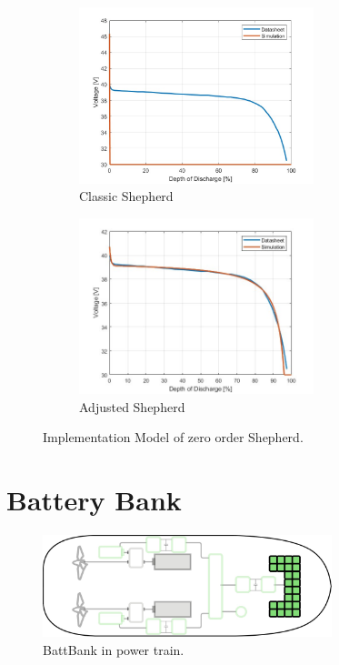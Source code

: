 \begin{figure}[h]

\begin{subfigure}{0.5\textwidth}
    \centering
    \includegraphics[width=0.75\textwidth]{images/chapter05/01_BattCell/BattCellSim1.jpg} 
    \caption{Classic Shepherd}
    \label{fig:subim1}
\end{subfigure}
\begin{subfigure}{0.5\textwidth}
    \centering
    \includegraphics[width=0.75\textwidth]{images/chapter05/01_BattCell/BattCellSim2.jpg} 
    \caption{Adjusted Shepherd}
    \label{fig:subim2}
\end{subfigure}

\caption{Implementation Model of zero order Shepherd.}
\label{fig:image2}
\end{figure}


\section{Battery Bank}

\begin{figure}[h!]
    \centering
    \includegraphics[width=0.75\textwidth]{images/chapter05/02_BattBank/BattBank_scheme.jpg}
    \caption{BattBank in power train.}
    \label{BattBank}
\end{figure}

